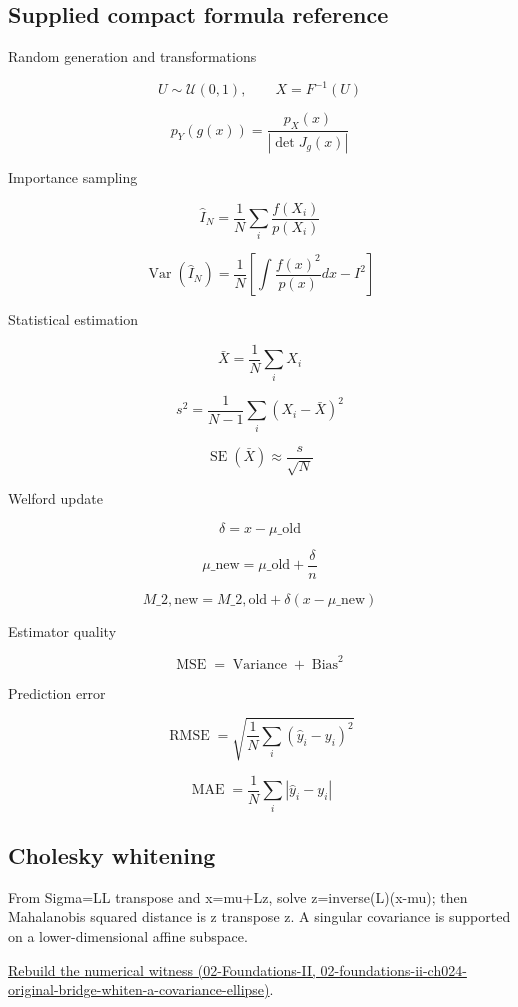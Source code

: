 \subsection{Supplied compact formula reference}\label{appendix-cb5af353ef77-supplied-compact-formula-reference}

Random generation and transformations

\[
 U\sim\mathcal U(0,1),\qquad X=F^{-1}(U) 
\]

\[
 p_Y(g(x)) = \frac{p_X(x)}{|\det J_g(x)|} 
\]

Importance sampling

\[
 \widehat I_N= \frac1N\sum_i\frac{f(X_i)}{p(X_i)} 
\]

\[
 \operatorname{Var}(\widehat I_N) = \frac1N \left[ \int\frac{f(x)^2}{p(x)}dx-I^2 \right] 
\]

Statistical estimation

\[
 \bar X=\frac1N\sum_iX_i 
\]

\[
 s^2=\frac1{N-1}\sum_i(X_i-\bar X)^2 
\]

\[
 \operatorname{SE}(\bar X)\approx\frac{s}{\sqrt N} 
\]

Welford update

\[
 \delta=x-\mu\_{\mathrm{old}} 
\]

\[
 \mu\_{\mathrm{new}}= \mu\_{\mathrm{old}}+\frac{\delta}{n} 
\]

\[
 M\_{2,\mathrm{new}}= M\_{2,\mathrm{old}}+ \delta(x-\mu\_{\mathrm{new}}) 
\]

Estimator quality

\[
 \operatorname{MSE}= \operatorname{Variance}+ \operatorname{Bias}^2 
\]

Prediction error

\[
 \operatorname{RMSE}= \sqrt{\frac1N\sum_i(\hat y_i-y_i)^2} 
\]

\[
 \operatorname{MAE}= \frac1N\sum_i|\hat y_i-y_i| 
\]

\subsection{Cholesky whitening}\label{appendix-cb5af353ef77-cholesky-whitening}

From Sigma=LL transpose and x=mu+Lz, solve z=inverse(L)(x-mu); then Mahalanobis squared distance is z transpose z. A singular covariance is supported on a lower-dimensional affine subspace.

\href{../02-Foundations-II/main.pdf\#nameddest=02-foundations-ii-ch024-original-bridge-whiten-a-covariance-ellipse}{Rebuild the numerical witness (02-Foundations-II, 02-foundations-ii-ch024-original-bridge-whiten-a-covariance-ellipse)}.

